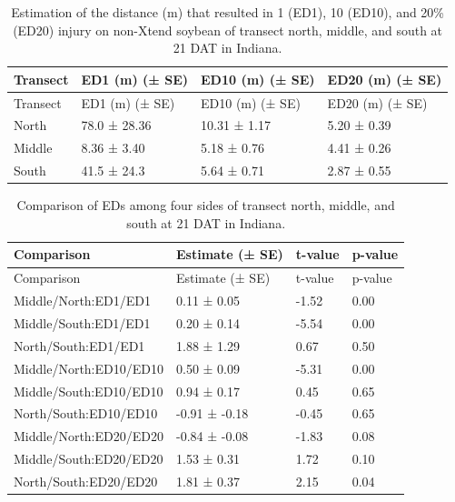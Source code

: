 \documentclass[]{article}
\begin{document}
\begin{longtable}[]{@{}llll@{}}
\caption{Estimation of the distance (m) that resulted in 1 (ED1), 10
(ED10), and 20\% (ED20) injury on non-Xtend soybean of transect north,
middle, and south at 21 DAT in Indiana.}\tabularnewline
\toprule
Transect & ED1 (m) (± SE) & ED10 (m) (± SE) & ED20 (m) (±
SE)\tabularnewline
\midrule
\endfirsthead
\toprule
Transect & ED1 (m) (± SE) & ED10 (m) (± SE) & ED20 (m) (±
SE)\tabularnewline
\midrule
\endhead
North & 78.0 ± 28.36 & 10.31 ± 1.17 & 5.20 ± 0.39\tabularnewline
Middle & 8.36 ± 3.40 & 5.18 ± 0.76 & 4.41 ± 0.26\tabularnewline
South & 41.5 ± 24.3 & 5.64 ± 0.71 & 2.87 ± 0.55\tabularnewline
\bottomrule
\end{longtable}

\begin{longtable}[]{@{}llll@{}}
\caption{Comparison of EDs among four sides of transect north, middle,
and south at 21 DAT in Indiana.}\tabularnewline
\toprule
Comparison & Estimate (± SE) & t-value & p-value\tabularnewline
\midrule
\endfirsthead
\toprule
Comparison & Estimate (± SE) & t-value & p-value\tabularnewline
\midrule
\endhead
Middle/North:ED1/ED1 & 0.11 ± 0.05 & -1.52 & 0.00\tabularnewline
Middle/South:ED1/ED1 & 0.20 ± 0.14 & -5.54 & 0.00\tabularnewline
North/South:ED1/ED1 & 1.88 ± 1.29 & 0.67 & 0.50\tabularnewline
Middle/North:ED10/ED10 & 0.50 ± 0.09 & -5.31 & 0.00\tabularnewline
Middle/South:ED10/ED10 & 0.94 ± 0.17 & 0.45 & 0.65\tabularnewline
North/South:ED10/ED10 & -0.91 ± -0.18 & -0.45 & 0.65\tabularnewline
Middle/North:ED20/ED20 & -0.84 ± -0.08 & -1.83 & 0.08\tabularnewline
Middle/South:ED20/ED20 & 1.53 ± 0.31 & 1.72 & 0.10\tabularnewline
North/South:ED20/ED20 & 1.81 ± 0.37 & 2.15 & 0.04\tabularnewline
\bottomrule
\end{longtable}
\end{document}
